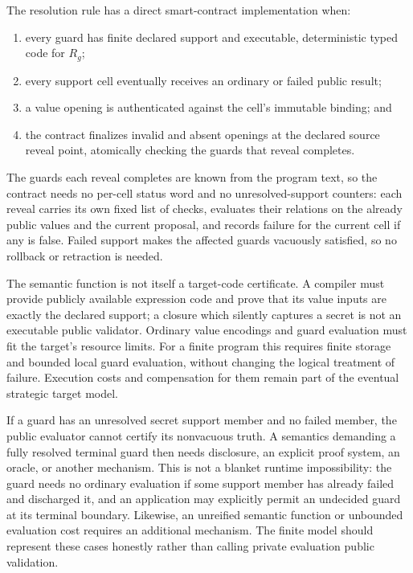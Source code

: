 \documentclass[11pt]{article}
\newcommand{\lean}[1]{\texttt{\detokenize{#1}}}
\begin{document}
The resolution rule has a direct smart-contract implementation when:
\begin{enumerate}
\item every guard has finite declared support and executable, deterministic
      typed code for $R_g$;
\item every support cell eventually receives an ordinary or failed public
      result;
\item a value opening is authenticated against the cell's immutable binding;
      and
\item the contract finalizes invalid and absent openings at the declared
      source reveal point, atomically checking the guards that reveal completes.
\end{enumerate}
The guards each reveal completes are known from the program text, so the
contract needs no per-cell status word and no unresolved-support counters: each
reveal carries its own fixed list of checks, evaluates their relations on the
already public values and the current proposal, and records failure for the
current cell if any is false.  Failed support makes the affected guards
vacuously satisfied, so no rollback or retraction is needed.

The semantic \lean{GuardCode.accepts} function is not itself a target-code
certificate. A compiler must provide publicly available expression code and
prove that its value inputs are exactly the declared support; a closure which
silently captures a secret is not an executable public validator. Ordinary
value encodings and guard evaluation must fit the target's resource limits.
For a finite program this requires finite storage and bounded local guard
evaluation, without changing the logical treatment of failure. Execution costs
and compensation for them remain part of the eventual strategic target model.

If a guard has an unresolved secret support member and no failed member, the
public evaluator cannot certify its nonvacuous truth.  A semantics demanding a
fully resolved terminal guard then needs disclosure, an explicit proof system,
an oracle, or another mechanism.  This is not a blanket runtime impossibility:
the guard needs no ordinary evaluation if some support member has already
failed and discharged it, and an application may explicitly permit an undecided
guard at its terminal boundary.  Likewise, an unreified semantic function or
unbounded evaluation cost requires an additional mechanism.  The finite model
should represent these cases honestly rather than calling private evaluation
public validation.
\end{document}
